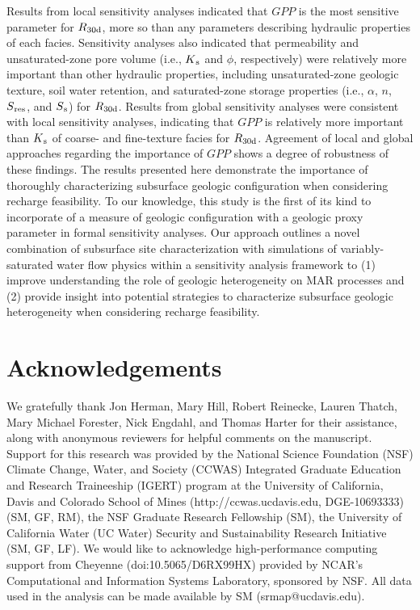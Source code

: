Results from local sensitivity analyses indicated that $GPP$  is the most sensitive parameter for $R\textsubscript{30d}$, more so than any parameters describing hydraulic properties of each facies. Sensitivity analyses also indicated that permeability and unsaturated-zone pore volume (i.e., $K\textsubscript{s}$ and $\phi$, respectively) were relatively more important than other hydraulic properties, including unsaturated-zone geologic texture, soil water retention, and saturated-zone storage properties (i.e., $\alpha$, $n$, $S\textsubscript{res}$, and $S\textsubscript{s}$) for $R\textsubscript{30d}$. Results from global sensitivity analyses were consistent with local sensitivity analyses, indicating that $GPP$ is relatively more important than $K\textsubscript{s}$ of coarse- and fine-texture facies for $R\textsubscript{30d}$. Agreement of local and global approaches regarding the importance of $GPP$ shows a degree of robustness of these findings. The results presented here demonstrate the importance of thoroughly characterizing subsurface geologic configuration when considering recharge feasibility. To our knowledge, this study is the first of its kind to incorporate of a measure of geologic configuration with a geologic proxy parameter in formal sensitivity analyses. Our approach outlines a novel combination of subsurface site characterization with simulations of variably-saturated water flow physics within a sensitivity analysis framework to (1) improve understanding the role of geologic heterogeneity on MAR processes and (2) provide insight into potential strategies to characterize subsurface geologic heterogeneity when considering recharge feasibility.

\section{Acknowledgements}
We gratefully thank Jon Herman, Mary Hill, Robert Reinecke, Lauren Thatch, Mary Michael Forester, Nick Engdahl, and Thomas Harter for their assistance, along with anonymous reviewers for helpful comments on the manuscript. Support for this research was provided by the National Science Foundation (NSF) Climate Change, Water, and Society (CCWAS) Integrated Graduate Education and Research Traineeship (IGERT) program at the University of California, Davis and Colorado School of Mines (http://ccwas.ucdavis.edu, DGE-10693333) (SM, GF, RM), the NSF Graduate Research Fellowship (SM), the University of California Water (UC Water) Security and Sustainability Research Initiative (SM, GF, LF). We would like to acknowledge high-performance computing support from Cheyenne (doi:10.5065/D6RX99HX) provided by NCAR's Computational and Information Systems Laboratory, sponsored by NSF. All data used in the analysis can be made available by SM (srmap@ucdavis.edu).


